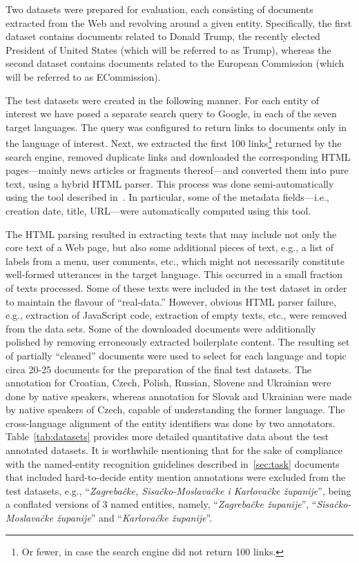 \documentclass[11pt]{article}
\begin{document}
Two datasets were prepared for evaluation, each consisting of documents
extracted from the Web and revolving around a given entity.
Specifically, the first dataset contains documents related to Donald
Trump, the recently elected President of United States (which will be
referred to as {\sc Trump}), whereas the second dataset contains
documents related to the European Commission (which will be referred to
as {\sc ECommission}).

The test datasets were created in the following manner.  For each entity
of interest we have posed a separate search query to Google, in each of
the seven target languages.  The query was configured to return links to
documents only in the language of interest.  Next, we extracted the first
100 links\footnote{Or fewer, in case the search engine did not return 100
  links.} returned by the search engine, removed duplicate links and
downloaded the corresponding HTML pages---mainly news articles or
fragments thereof---and converted them into pure text, using a hybrid
HTML parser.  This process was done semi-automatically using the tool
described in~\cite{Crawley:ea:2010}.  In particular, some of the metadata
fields---i.e., creation date, title, URL---were automatically computed
using this tool.


The HTML parsing resulted in extracting texts that may include not only
the core text of a Web page, but also some additional pieces of text,
e.g., a list of labels from a menu, user comments, etc., which might not
necessarily constitute well-formed utterances in the target language.
This occurred in a small fraction of texts processed.  Some of
these texts were included in the test dataset in order to maintain the
flavour of ``real-data.''  However, obvious HTML parser failure, e.g.,
extraction of JavaScript code, extraction of empty texts, etc., were removed
from the data sets.  Some of the downloaded documents were
additionally polished by removing erroneously extracted boilerplate
content.  The resulting set of partially ``cleaned'' documents were used to
select for each language and topic circa 20-25 documents for the
preparation of the final test datasets. The annotation for Croatian,
Czech, Polish, Russian, Slovene and Ukrainian were done by native speakers, whereas
annotation for Slovak and Ukrainian were made by native speakers of Czech, capable 
of understanding the former language. The cross-language alignment of the entity identifiers was
done by two annotators. Table~\ref{tab:datasets} provides more detailed
quantitative data about the test annotated datasets. It is worthwhile mentioning 
that for the sake of compliance with the named-entity recognition guidelines described
in~\ref{sec:task} documents that included hard-to-decide entity mention annotations 
were excluded from the test datasets, e.g., ``\textit{Zagrebačke, Sisačko-Moslavačke i Karlovačke županije}'', 
being a conflated versions of 3 named entities, namely, ``\textit{Zagrebačke županije}'',
``\textit{Sisačko-Moslavačke županije}'' and ``\textit{Karlovačke županije}''.
\end{document}
